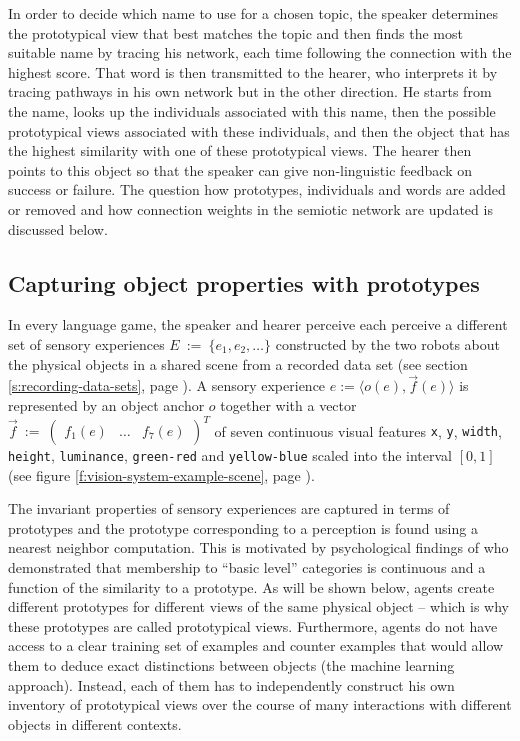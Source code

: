 In order to decide which name to use for a chosen topic, the speaker
determines the prototypical view that best matches the topic and then
finds the most suitable name by tracing his network, each time
following the connection with the highest score. That word is then
transmitted to the hearer, who interprets it by tracing pathways in
his own network but in the other direction. He starts from the name,
looks up the individuals associated with this name, then the possible
prototypical views associated with these individuals, and then the
object that has the highest similarity with one of these prototypical
views. The hearer then points to this object so that the speaker can
give non-linguistic feedback on success or failure. The question how
prototypes, individuals and words are added or removed and how
connection weights in the semiotic network are updated is discussed
below.


\subsection{Capturing object properties with prototypes}
\label{s:gng-prototypes}

In every language game, the speaker and hearer perceive each perceive
a different set of sensory experiences $E~:=~\{e_1,e_2,\dots\}$
constructed by the two robots about the physical objects in a shared
scene from a recorded data set (see section
\ref{s:recording-data-sets}, page \pageref{s:recording-data-sets}). A
sensory experience $e := \langle o(e), \vec{f}(e) \rangle$ is
represented by an object anchor $o$ together with a vector
$\vec{f}~:=~\begin{pmatrix} f_1(e) & \dots & f_7(e)\end{pmatrix}^T$ of
seven continuous visual features {\tt x}, {\tt y}, {\tt width}, {\tt
  height}, {\tt luminance}, {\tt green-red} and {\tt yellow-blue}
scaled into the interval $[0,1]$ (see figure
\ref{f:vision-system-example-scene}, page
\pageref{f:vision-system-example-scene}).


The invariant properties of sensory experiences are captured in terms
of prototypes \citep{edelman95representation,edelman98representation}
and the prototype corresponding to a perception is found using a
nearest neighbor computation. This is motivated by psychological
findings of \cite{rosch73natural,mervis81categorization} who
demonstrated that membership to ``basic level'' categories is
continuous and a function of the similarity to a prototype. As will be
shown below, agents create different prototypes for different views of
the same physical object -- which is why these prototypes are called
prototypical views. Furthermore, agents do not have access to a clear
training set of examples and counter examples that would allow them to
deduce exact distinctions between objects (the machine learning
approach). Instead, each of them has to independently construct his
own inventory of prototypical views over the course of many
interactions with different objects in different contexts.

